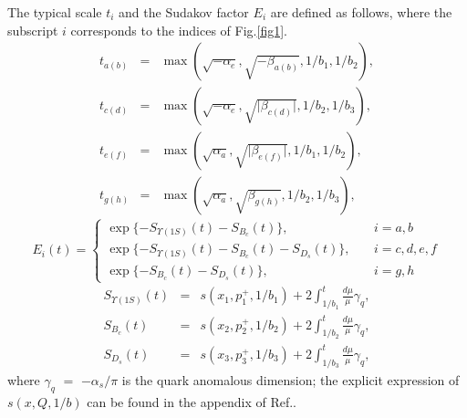 \documentclass[preprint,superscriptaddress,nofootinbib]{revtex4}
\begin{document}
\begin{appendix}
  The typical scale $t_{i}$ and the Sudakov factor $E_{i}$
  are defined as follows, where the subscript $i$ corresponds
  to the indices of Fig.\ref{fig1}.
   \begin{eqnarray}
   t_{a(b)} &=& {\max}(\sqrt{-{\alpha}_{e}},\sqrt{-{\beta}_{a(b)}},1/b_{1},1/b_{2})
   \label{tab}, \\
   t_{c(d)} &=& {\max}(\sqrt{-{\alpha}_{e}},\sqrt{{\vert}{\beta}_{c(d)}{\vert}},1/b_{2},1/b_{3})
   \label{tcd}, \\
   t_{e(f)} &=& {\max}(\sqrt{{\alpha}_{a}},\sqrt{{\vert}{\beta}_{e(f)}{\vert}},1/b_{1},1/b_{2})
   \label{tef}, \\
   t_{g(h)} &=& {\max}(\sqrt{{\alpha}_{a}},\sqrt{{\beta}_{g(h)}},1/b_{2},1/b_{3})
   \label{tgh},
   \end{eqnarray}
   \begin{equation}
   E_{i}(t) =
   \left\{ \begin{array}{lll}
  {\exp}\{ -S_{{\Upsilon}(1S)}(t)-S_{B_{c}}(t) \}, &~& i=a,b \\
  {\exp}\{ -S_{{\Upsilon}(1S)}(t)-S_{B_{c}}(t)-S_{D_{s}}(t) \}, & & i=c,d,e,f \\
  {\exp}\{ -S_{B_{c}}(t)-S_{D_{s}}(t) \}, & & i=g,h
   \end{array} \right.
   \label{sudakov-exp}
   \end{equation}
   \begin{eqnarray}
   S_{{\Upsilon}(1S)}(t) &=&
   s(x_{1},p_{1}^{+},1/b_{1})
  +2{\int}_{1/b_{1}}^{t}\frac{d{\mu}}{\mu}{\gamma}_{q}
   \label{sudakov-bc}, \\
   S_{B_{c}}(t) &=&
   s(x_{2},p_{2}^{+},1/b_{2})
  +2{\int}_{1/b_{2}}^{t}\frac{d{\mu}}{\mu}{\gamma}_{q}
   \label{sudakov-bc}, \\
   S_{D_{s}}(t) &=&
   s(x_{3},p_{3}^{+},1/b_{3})
  +2{\int}_{1/b_{3}}^{t}\frac{d{\mu}}{\mu}{\gamma}_{q}
   \label{sudakov-ds},
   \end{eqnarray}
  where ${\gamma}_{q}$ $=$ $-{\alpha}_{s}/{\pi}$ is the
  quark anomalous dimension;
  the explicit expression of $s(x,Q,1/b)$ can be found in
  the appendix of Ref.\cite{pqcd1}.
  \end{appendix}
\end{document}

